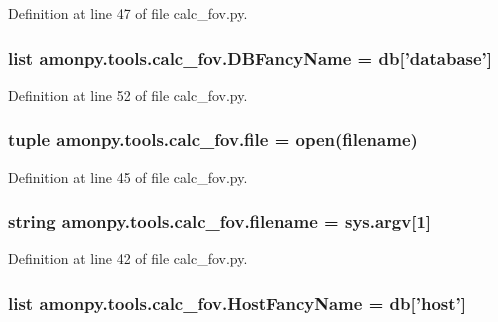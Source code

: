 Definition at line 47 of file calc\-\_\-fov.\-py.

\hypertarget{namespaceamonpy_1_1tools_1_1calc__fov_aaea6d1eb2555bb480ec49524534e7d7d}{
\subsubsection[{D\-B\-Fancy\-Name}]{\setlength{\rightskip}{0pt plus 5cm}list amonpy.\-tools.\-calc\-\_\-fov.\-D\-B\-Fancy\-Name = {\bf db}\mbox{[}'database'\mbox{]}}}\label{namespaceamonpy_1_1tools_1_1calc__fov_aaea6d1eb2555bb480ec49524534e7d7d}


Definition at line 52 of file calc\-\_\-fov.\-py.

\hypertarget{namespaceamonpy_1_1tools_1_1calc__fov_a15d9d06da5b6c8cfcf67268b8dac0a9e}{
\subsubsection[{file}]{\setlength{\rightskip}{0pt plus 5cm}tuple amonpy.\-tools.\-calc\-\_\-fov.\-file = open({\bf filename})}}\label{namespaceamonpy_1_1tools_1_1calc__fov_a15d9d06da5b6c8cfcf67268b8dac0a9e}


Definition at line 45 of file calc\-\_\-fov.\-py.

\hypertarget{namespaceamonpy_1_1tools_1_1calc__fov_affa2b5e823ee36cb35cd6ff636ea9779}{
\subsubsection[{filename}]{\setlength{\rightskip}{0pt plus 5cm}string amonpy.\-tools.\-calc\-\_\-fov.\-filename = sys.\-argv\mbox{[}1\mbox{]}}}\label{namespaceamonpy_1_1tools_1_1calc__fov_affa2b5e823ee36cb35cd6ff636ea9779}


Definition at line 42 of file calc\-\_\-fov.\-py.

\hypertarget{namespaceamonpy_1_1tools_1_1calc__fov_a08d7bd374fdd9e63ae99ef1bfb9e491e}{
\subsubsection[{Host\-Fancy\-Name}]{\setlength{\rightskip}{0pt plus 5cm}list amonpy.\-tools.\-calc\-\_\-fov.\-Host\-Fancy\-Name = {\bf db}\mbox{[}'host'\mbox{]}}}\label{namespaceamonpy_1_1tools_1_1calc__fov_a08d7bd374fdd9e63ae99ef1bfb9e491e}


